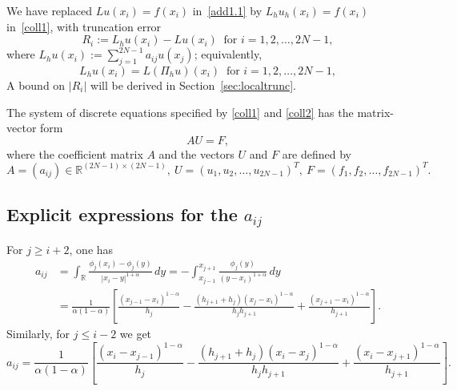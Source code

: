 \documentclass[smallextended]{svjour3}       %
\begin{document}
We have replaced $Lu(x_i)=f(x_i)$ in~\eqref{add1.1} by $L_hu_h(x_i)=f(x_i)$ in~\eqref{coll1}, 
with truncation error 
\begin{equation}\label{trunc}
R_i:=L_hu(x_i)-Lu(x_i) \ \text{ for } i=1,2,\dots, 2N-1, 
\end{equation}
where $L_hu(x_i) := \sum_{j=1}^{2N-1} a_{i j}u(x_j)$; equivalently,
\begin{equation}\label{Lhu}
L_hu(x_i) = L(\Pi_h u)(x_i) \ \text{ for } i=1,2,\dots, 2N-1, 
\end{equation}
A bound on $|R_i|$ will be derived in Section~\ref{sec:localtrunc}.

The system of discrete equations specified by \eqref{coll1} and \eqref{coll2}
 has the matrix-vector form
	\begin{equation}\label{add2.5}
		A U=F,
	\end{equation}
	where  the coefficient matrix $A$ and the vectors $U$ and $F$ are defined by
	\[
	A=(a_{ij})\in \mathbb{R}^{\left(2N-1\right)\times \left(2N-1\right)} , 
	\ U=(u_1,u_2,\dots,u_{2N-1})^T, \ F=(f_1,f_2,\dots,f_{2N-1})^T.
	\]
	
%	
%	
	\subsection{Explicit expressions for the $a_{ij}$}
	For $j\ge i+2$,  one has
	\begin{equation*}
		\begin{split}
			a_{ij}
			&= \int_{\mathbb{R}}\frac{\phi_j(x_i)-\phi_j(y)}{\left | x_i-y \right |^{1+\alpha } }\,dy
			= -\int_{x_{j-1}}^{x_{j+1}} \frac{\phi_j(y)}{( y-x_i )^{1+\alpha } }\,dy\\
			&=\frac{1}{\alpha (1-\alpha )} \left [ \frac{(x_{j-1}-x_i)^{1-\alpha }}{h_{j}}- \frac{(h_{j+1}+h_{j})(x_j-x_i)^{1-\alpha }}{h_{j}h_{j+1}}+\frac{(x_{j+1}-x_i)^{1-\alpha }}{h_{j+1}} \right ].
		\end{split}
	\end{equation*}
Similarly, for $j\le i-2$  we get
	\begin{equation*}
		a_{ij}=\frac{1}{\alpha (1-\alpha )} \left [\frac{(x_i-x_{j-1})^{1-\alpha }}{h_{j}} - \frac{(h_{j+1}+h_{j})(x_{i}-x_{j})^{1-\alpha }}{h_{j}h_{j+1}}+\frac{(x_{i}-x_{j+1})^{1-\alpha }}{h_{j+1}} \right ].
	\end{equation*}
	
\end{document}
